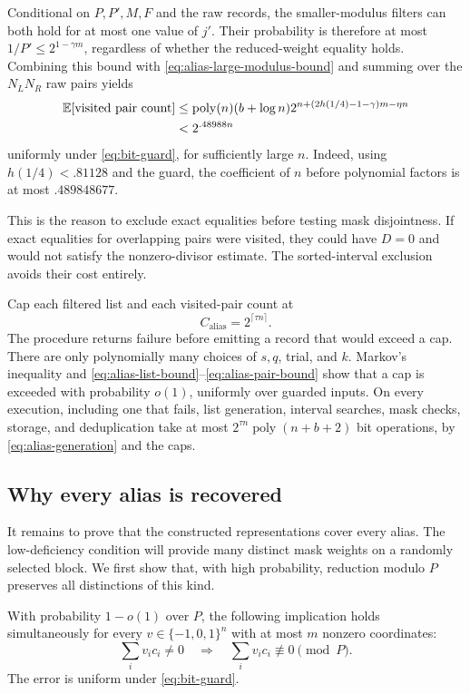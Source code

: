 Conditional on $P,P',M,F$ and the raw records, the smaller-modulus filters
can both hold for at most one value of $j'$.  Their probability is
therefore at most $1/P'\le 2^{1-\gamma m}$, regardless of whether the
reduced-weight equality holds.  Combining this bound with
\eqref{eq:alias-large-modulus-bound} and summing over the $N_LN_R$ raw
pairs yields
\begin{align}
 \mathbb E[\text{visited pair count}]
 &\le \operatorname{poly}(n)(b+\log n)
      2^{n+(2h(1/4)-1-\gamma)m-\eta n}\notag\\
 &<2^{.48988n}
 \label{eq:alias-pair-bound}
\end{align}
uniformly under \eqref{eq:bit-guard}, for sufficiently large $n$.
Indeed, using $h(1/4)<.81128$ and the guard, the coefficient of $n$
before polynomial factors is at most $.489848677$.

This is the reason to exclude exact equalities before testing mask
disjointness.  If exact equalities for overlapping pairs were visited,
they could have $D=0$ and would not satisfy the nonzero-divisor estimate.
The sorted-interval exclusion avoids their cost entirely.

Cap each filtered list and each visited-pair count at
\begin{equation}
 C_{\mathrm{alias}}=2^{\lceil\tau n\rceil}.
 \label{eq:alias-cap}
\end{equation}
The procedure returns failure before emitting a record that would exceed
a cap.  There are only polynomially many choices of $s,q$, trial, and
$k$.  Markov's inequality and
\eqref{eq:alias-list-bound}--\eqref{eq:alias-pair-bound} show that a cap
is exceeded with probability $o(1)$, uniformly over guarded inputs.
On every execution, including one that fails, list generation,
interval searches, mask checks, storage, and deduplication take at most
$2^{\tau n}\operatorname{poly}(n+b+2)$ bit operations, by
\eqref{eq:alias-generation} and the caps.

\subsection{Why every alias is recovered}

It remains to prove that the constructed representations cover every
alias.  The low-deficiency condition will provide many distinct mask
weights on a randomly selected block.  We first show that, with high
probability, reduction modulo $P$ preserves all distinctions of this kind.

\begin{lemma}
\label{lem:sparse-distinction}
With probability $1-o(1)$ over $P$, the following implication holds
simultaneously for every $v\in\{-1,0,1\}^n$ with at most $m$ nonzero
coordinates:
\begin{equation}
 \sum_i v_ic_i\ne0
 \quad\Longrightarrow\quad
 \sum_i v_ic_i\not\equiv0\pmod P.
 \label{eq:sparse-distinction}
\end{equation}
The error is uniform under \eqref{eq:bit-guard}.
\end{lemma}

